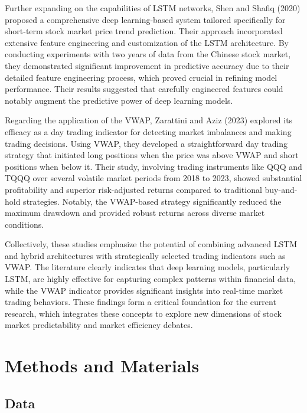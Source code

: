 \documentclass[10pt,a4paper]{article}
\begin{document}
Further expanding on the capabilities of LSTM networks, Shen and Shafiq (2020) \cite{shen2020shortterm} proposed a comprehensive deep learning-based system tailored specifically for short-term stock market price trend prediction. Their approach incorporated extensive feature engineering and customization of the LSTM architecture. By conducting experiments with two years of data from the Chinese stock market, they demonstrated significant improvement in predictive accuracy due to their detailed feature engineering process, which proved crucial in refining model performance. Their results suggested that carefully engineered features could notably augment the predictive power of deep learning models.

Regarding the application of the VWAP, Zarattini and Aziz (2023) \cite{zarattini2023vwap} explored its efficacy as a day trading indicator for detecting market imbalances and making trading decisions. Using VWAP, they developed a straightforward day trading strategy that initiated long positions when the price was above VWAP and short positions when below it. Their study, involving trading instruments like QQQ and TQQQ over several volatile market periods from 2018 to 2023, showed substantial profitability and superior risk-adjusted returns compared to traditional buy-and-hold strategies. Notably, the VWAP-based strategy significantly reduced the maximum drawdown and provided robust returns across diverse market conditions.

Collectively, these studies emphasize the potential of combining advanced LSTM and hybrid architectures with strategically selected trading indicators such as VWAP. The literature clearly indicates that deep learning models, particularly LSTM, are highly effective for capturing complex patterns within financial data, while the VWAP indicator provides significant insights into real-time market trading behaviors. These findings form a critical foundation for the current research, which integrates these concepts to explore new dimensions of stock market predictability and market efficiency debates.



\section{Methods and Materials}

\subsection{Data}
\end{document}
